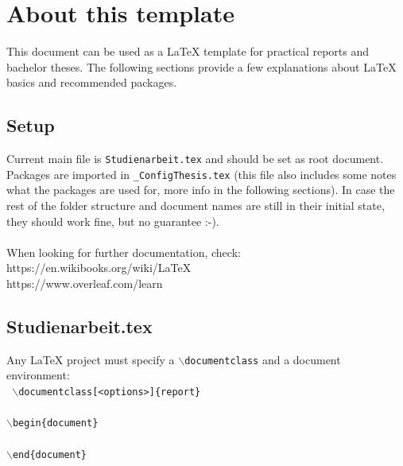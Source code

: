 \chapter{About this template}
This document can be used as a LaTeX template for practical reports and bachelor theses. 
The following sections provide a few explanations about LaTeX basics and recommended packages.

\section{Setup}
Current main file is \texttt{Studienarbeit.tex} and should be set as root document. Packages are imported in \texttt{\_ConfigThesis.tex} (this file also includes some notes what the packages are used for, more info in the following sections). In case the rest of the folder structure and document names are still in their initial state, they should work fine, but no guarantee :-).
\\
\\ When looking for further documentation, check: \\
https://en.wikibooks.org/wiki/LaTeX \\
https://www.overleaf.com/learn

\section{Studienarbeit.tex}
Any LaTeX project must specify a \texttt{$\backslash$documentclass} and a document environment: \\
\newpage %
\texttt{
$\backslash$documentclass[<options>]\{report\} \\
\\
$\backslash$begin\{document\} \\
\\
$\backslash$end\{document\}
}

